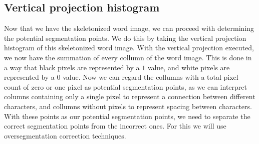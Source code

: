 \documentclass{article}
\begin{document}
\subsection{Vertical projection histogram}
Now that we have the skeletonized word image, we can proceed with determining the potential segmentation points.
We do this by taking the vertical projection histogram of this skeletonized word image.
With the vertical projection executed, we now have the summation of every collumn of the word image.
This is done in a way that black pixels are represented by a $1$ value, and white pixels are represented by a $0$ value.
Now we can regard the collumns with a total pixel count of zero or one pixel as potential segmentation points, as we can interpret columns containing only a single pixel to represent a connection between different characters, and collumns without pixels to represent spacing between characters.
With these points as our potential segmentation points, we need to separate the correct segmentation points from the incorrect ones.
For this we will use oversegmentation correction techniques.
\end{document}
